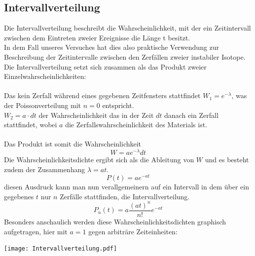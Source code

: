 \documentclass{article}
\begin{document}
	\subsection{Intervallverteilung}
	Die Intervallverteilung beschreibt die Wahrscheinlichkeit, mit der ein Zeitintervall zwischen dem Eintreten zweier Ereignisse die Länge t besitzt.\\
	In dem Fall unseres Versuches hat dies also praktische Verwendung zur Beschreibung der Zeitintervalle zwischen den Zerfällen zweier instabiler Isotope.\\
	Die Intervallverteilung setzt sich zusammen als das Produkt zweier Einzelwahrscheinlichkeiten:\\\\
	Das kein Zerfall während eines gegebenen Zeitfensters stattfindet $W_1=e^{-\lambda}$, was der Poissonverteilung mit $n=0$ entspricht.\\
	$W_2=a\cdot dt$ der Wahrscheinlichkeit das in der Zeit $dt$ danach ein Zerfall stattfindet, wobei $a$ die Zerfallswahrscheinlichkeit des Materials ist.\\\\
	Das Produkt ist somit die Wahrscheinlichkeit
	\begin{equation}
	W=ae^{-\lambda}dt
	\end{equation}
	Die Wahrscheinlichkeitsdichte ergibt sich als die Ableitung von $W$ und es besteht zudem der Zusammenhang $\lambda=at$.
	\begin{equation}
	P(t)=ae^{-at}
	\end{equation}
	diesen Ausdruck kann man nun verallgemeinern auf ein Intervall in dem über ein gegebenes $t$ nur $n$ Zerfälle stattfinden, die Intervallverteilung.
	\begin{equation}
	P_n(t)=a\frac{(at)^n}{n!}e^{-at}
	\end{equation} 
	Besonders anschaulich werden diese Wahrscheinlichkeitsdichten graphisch aufgetragen, hier mit $a=1$ gegen arbiträre Zeiteinheiten:
	\begin{center}
	\texttt{[image: Intervallverteilung.pdf]}
	\end{center} 
\end{document}
